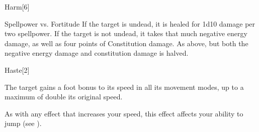 \begin{spellsection}{Harm}[6]
    \begin{spellheader}
    \end{spellheader}
    \begin{spellcontent}
        \begin{spelltargetinginfo}
        \end{spelltargetinginfo}
        \begin{spelleffects}
            \begin{spellattack}{Spellpower vs. Fortitude}
                \spelleffect If the target is undead, it is healed for 1d10 damage per two spellpower.
                \spellsuccess If the target is not undead, it takes that much negative energy damage, as well as four points of Constitution damage.
                \spellfailure As above, but both the negative energy damage and constitution damage is halved.
            \end{spellattack}
        \end{spelleffects}
    \end{spellcontent}
    \begin{spellfooter}
        \miscastrandom
    \end{spellfooter}
\end{spellsection}

\begin{spellsection}[Lesser]{Haste}[2]
    \begin{spellheader}
    \end{spellheader}
    \begin{spellcontent}
        \begin{spelltargetinginfo}
        \end{spelltargetinginfo}
        \begin{spelleffects}
            \spelleffect The target gains a  foot bonus to its speed in all its movement modes, up to a maximum of double its original speed.
            \spelldur \durshort \dismissable
        \end{spelleffects}
    \end{spellcontent}
    \begin{spellfooter}
        \spellnotes As with any effect that increases your speed, this effect affects your ability to jump (see ).
        \miscastrandom
    \end{spellfooter}
\end{spellsection}

